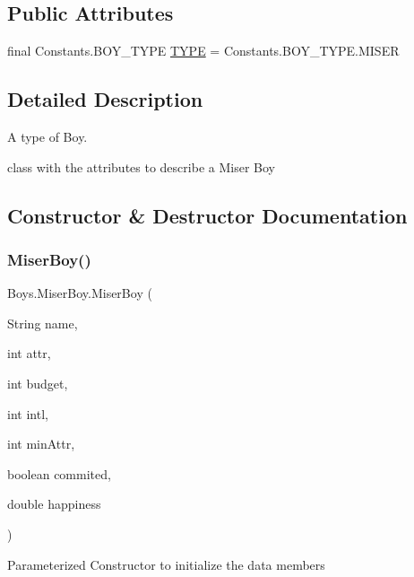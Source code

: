 \subsection*{Public Attributes}
\begin{DoxyCompactItemize}
\item 
final Constants.\+B\+O\+Y\+\_\+\+T\+Y\+PE \hyperlink{class_boys_1_1_miser_boy_aa5bf26722d983a7d36c805e2d117ac7d}{T\+Y\+PE} = Constants.\+B\+O\+Y\+\_\+\+T\+Y\+P\+E.\+M\+I\+S\+ER
\end{DoxyCompactItemize}


\subsection{Detailed Description}
A type of Boy. 

class with the attributes to describe a Miser Boy 

\subsection{Constructor \& Destructor Documentation}
\mbox{\label{class_boys_1_1_miser_boy_a633cc017e9d5a41e6cd4b7fc71a0f3fb}} 
\subsubsection{\texorpdfstring{Miser\+Boy()}{MiserBoy()}\hspace{0.1cm}{\footnotesize\ttfamily [1/2]}}
{\footnotesize\ttfamily Boys.\+Miser\+Boy.\+Miser\+Boy (\begin{DoxyParamCaption}\item[{String}]{name,  }\item[{int}]{attr,  }\item[{int}]{budget,  }\item[{int}]{intl,  }\item[{int}]{min\+Attr,  }\item[{boolean}]{commited,  }\item[{double}]{happiness }\end{DoxyParamCaption})\hspace{0.3cm}{\ttfamily [inline]}}

Parameterized Constructor to initialize the data members \mbox{\label{class_boys_1_1_miser_boy_a8b55643f4b48e43867d8171425177c8f}} 
